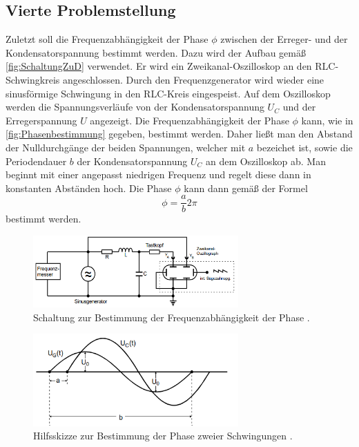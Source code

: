\subsection{Vierte Problemstellung}
Zuletzt soll die Frequenzabhängigkeit der Phase $\phi$ zwischen der Erreger- und der Kondensatorspannung bestimmt werden. Dazu wird der Aufbau gemäß \autoref{fig:SchaltungZuD} verwendet.
Er wird ein Zweikanal-Oszilloskop an den RLC-Schwingkreis angeschlossen. Durch den Frequenzgenerator wird wieder eine sinusförmige Schwingung in den RLC-Kreis eingespeist.
Auf dem Oszilloskop werden die Spannungsverläufe von der Kondensatorspannung $U_{C}$ und der Erregerspannung $U$ angezeigt. Die Frequenzabhängigkeit der Phase $\phi$ kann, wie 
in \autoref{fig:Phasenbestimmung} gegeben, bestimmt werden. Daher ließt man den Abstand der Nulldurchgänge der beiden Spannungen, welcher mit $a$ bezeichet ist, sowie die
Periodendauer $b$ der Kondensatorspannung $U_{C}$ an dem Oszilloskop ab. 
Man beginnt mit einer angepasst niedrigen Frequenz und regelt diese dann in konstanten Abständen hoch. Die Phase $\phi$ kann dann gemäß der Formel 
\begin{equation}
    \label{eqn:Phase}
    \phi = \frac{a}{b}2\pi 
\end{equation}
bestimmt werden.
\begin{figure}
    \centering
    \includegraphics[width=0.7\textwidth]{content/SchaltungZuD.pdf}
    \caption{Schaltung zur Bestimmung der Frequenzabhängigkeit der Phase \cite{v354}.}    
    \label{fig:SchaltungZuD}
\end{figure}
\begin{figure}
    \centering
    \includegraphics[width=0.7\textwidth]{content/Phasenbestimmung.pdf}
    \caption{Hilfsskizze zur Bestimmung der Phase zweier Schwingungen \cite{v353}.}    
    \label{fig:Phasenbestimmung}
\end{figure}